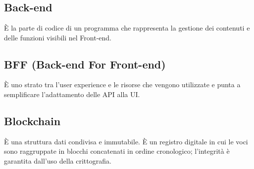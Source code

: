 \section{}
\subsection*{Back-end} È la parte di codice di un programma che rappresenta la gestione dei contenuti e delle funzioni visibili nel Front-end.

\subsection*{BFF (Back-end For Front-end)} È uno strato tra l'user experience e le risorse che vengono utilizzate e punta a semplificare l'adattamento delle API alla UI.

\subsection*{Blockchain} È una struttura dati condivisa e immutabile. È un registro digitale in cui le voci sono raggruppate in blocchi concatenati in ordine cronologico; l'integrità è garantita dall'uso della crittografia.